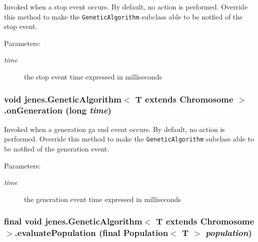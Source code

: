 Invoked when a stop event occurs. By default, no action is performed. Override this method to make the {\tt GeneticAlgorithm} subclass able to be notfied of the stop event.

\begin{Desc}
\item[Parameters:]
\begin{description}
\item[{\em time}]the stop event time expressed in milliseconds \end{description}
\end{Desc}
\hypertarget{classjenes_1_1_genetic_algorithm_3_01_t_01extends_01_chromosome_01_4_ed0d630f1e0b290bb87ba9ab8b164b89}{
\subsubsection[onGeneration]{\setlength{\rightskip}{0pt plus 5cm}void jenes.GeneticAlgorithm$<$ T extends Chromosome $>$.onGeneration (long {\em time})}}
\label{classjenes_1_1_genetic_algorithm_3_01_t_01extends_01_chromosome_01_4_ed0d630f1e0b290bb87ba9ab8b164b89}


Invoked when a generation ga end event occurs. By default, no action is performed. Override this method to make the {\tt GeneticAlgorithm} subclass able to be notfied of the generation event.

\begin{Desc}
\item[Parameters:]
\begin{description}
\item[{\em time}]the generation event time expressed in milliseconds \end{description}
\end{Desc}
\hypertarget{classjenes_1_1_genetic_algorithm_3_01_t_01extends_01_chromosome_01_4_b90dc099bae1616275779f59f400a59b}{
\subsubsection[evaluatePopulation]{\setlength{\rightskip}{0pt plus 5cm}final void jenes.GeneticAlgorithm$<$ T extends Chromosome $>$.evaluatePopulation (final Population$<$ T $>$ {\em population})}}
\label{classjenes_1_1_genetic_algorithm_3_01_t_01extends_01_chromosome_01_4_b90dc099bae1616275779f59f400a59b}


